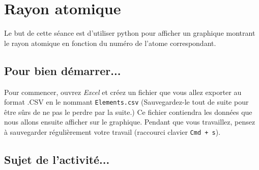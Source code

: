 
%
%
%
%

\chapter{Rayon atomique}\label{ficheTableur4e1}

Le but de cette séance est d'utiliser python pour afficher un graphique montrant le rayon atomique en fonction du numéro de l'atome correspondant.

\section{Pour bien démarrer...}

Pour commencer, ouvrez \emph{Excel} et créez un fichier que vous allez exporter au format .CSV en le nommant \texttt{Elements.csv} (Sauvegardez-le tout de suite pour être sûrs de ne pas le perdre par la suite.) Ce fichier contiendra les données que nous allons ensuite afficher sur le graphique. Pendant que vous travaillez, pensez à sauvegarder régulièrement votre travail (raccourci clavier \texttt{Cmd + s}).   



\section{Sujet de l'activité...}


